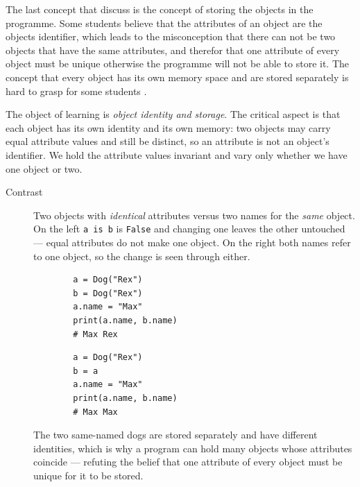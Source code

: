 The last concept that \textcite{Holland1997} discuss is the concept of 
storing the objects in the programme. Some students believe that the 
attributes of an 
object are the objects identifier, which leads to the misconception that 
there can not be two objects that have the same attributes, and therefor that 
one 
attribute of every object must be unique otherwise the programme will not be 
able to store it. The concept that every object has its own memory space and 
are 
stored separately is hard to grasp for some students \autocite{
Holland1997,Ragonis2005OOP}. 

The object of learning is \emph{object identity and storage}. The critical
aspect is that each object has its own identity and its own memory: two objects
may carry equal attribute values and still be distinct, so an attribute is not an
object's identifier. We hold the attribute values invariant and vary only
whether we have one object or two.

\begin{description}
  \item[Contrast] Two objects with \emph{identical} attributes versus two names
    for the \emph{same} object. On the left \texttt{a is b} is
    \texttt{False} and changing one leaves the other untouched ---
    equal attributes do not make one object. On the right both names refer to one
    object, so the change is seen through either.

    \hfill
    \begin{minipage}[t]{0.45\columnwidth}
      \begin{verbatim}
        a = Dog("Rex")
        b = Dog("Rex")
        a.name = "Max"
        print(a.name, b.name)
        # Max Rex
      \end{verbatim}
    \end{minipage}
    \hfill
    \begin{minipage}[t]{0.45\columnwidth}
      \begin{verbatim}
        a = Dog("Rex")
        b = a
        a.name = "Max"
        print(a.name, b.name)
        # Max Max
      \end{verbatim}
    \end{minipage}
    \newline
    The two same-named dogs are stored separately and have different identities,
    which is why a program can hold many objects whose attributes coincide ---
    refuting the belief that one attribute of every object must be unique for it
    to be stored.
\end{description}

